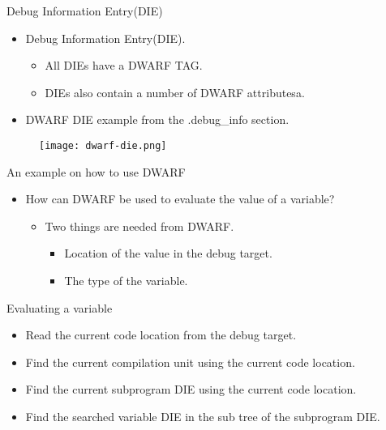 
\begin{frame}{Debug Information Entry(DIE)}
	\begin{itemize}
	    \item Debug Information Entry(DIE).
		\begin{itemize}
	    		\item All DIEs have a DWARF TAG.
	    		\item DIEs also contain a number of DWARF attributesa.
		\end{itemize}
	    \item DWARF DIE example from the .debug\_info section.
	\end{itemize}
	\begin{figure}
		\texttt{[image: dwarf-die.png]}
	\end{figure}
\end{frame}


\begin{frame}{An example on how to use DWARF}
	\begin{itemize}
	    \item How can DWARF be used to evaluate the value of a variable?
		\begin{itemize}
		    \item Two things are needed from DWARF.
			\begin{itemize}
			    \item Location of the value in the debug target.
			    \item The type of the variable.
			\end{itemize}
		\end{itemize}
	\end{itemize}
\end{frame}


\begin{frame}{Evaluating a variable}
	\begin{itemize}
		\item Read the current code location from the debug target.
		\item Find the current compilation unit using the current code location.
		\item Find the current subprogram DIE using the current code location.
		\item Find the searched variable DIE in the sub tree of the subprogram DIE. 
	\end{itemize}
\end{frame}

